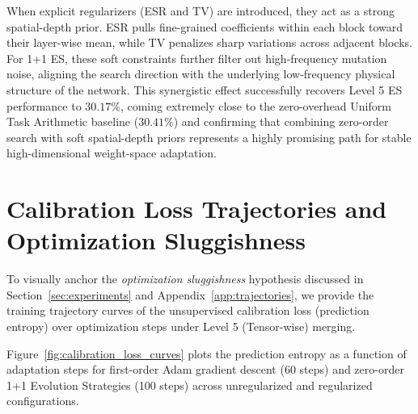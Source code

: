 \documentclass{article}
\theoremstyle{plain}
\theoremstyle{definition}
\theoremstyle{remark}
\begin{document}
When explicit regularizers (ESR and TV) are introduced, they act as a strong spatial-depth prior. ESR pulls fine-grained coefficients within each block toward their layer-wise mean, while TV penalizes sharp variations across adjacent blocks. For 1+1 ES, these soft constraints further filter out high-frequency mutation noise, aligning the search direction with the underlying low-frequency physical structure of the network. This synergistic effect successfully recovers Level 5 ES performance to $30.17\%$, coming extremely close to the zero-overhead Uniform Task Arithmetic baseline ($30.41\%$) and confirming that combining zero-order search with soft spatial-depth priors represents a highly promising path for stable high-dimensional weight-space adaptation.

\section{Calibration Loss Trajectories and Optimization Sluggishness}
\label{app:loss_curves}

To visually anchor the \emph{optimization sluggishness} hypothesis discussed in Section~\ref{sec:experiments} and Appendix~\ref{app:trajectories}, we provide the training trajectory curves of the unsupervised calibration loss (prediction entropy) over optimization steps under Level 5 (Tensor-wise) merging. 

Figure~\ref{fig:calibration_loss_curves} plots the prediction entropy as a function of adaptation steps for first-order Adam gradient descent (60 steps) and zero-order 1+1 Evolution Strategies (100 steps) across unregularized and regularized configurations.
\end{document}
